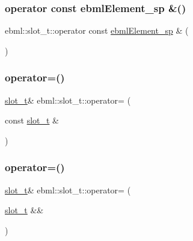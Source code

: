 \subsubsection{\texorpdfstring{operator const ebml\+Element\+\_\+sp \&()}{operator const ebmlElement\_sp \&()}}
{\footnotesize\ttfamily ebml\+::slot\+\_\+t\+::operator const \mbox{\hyperlink{namespaceebml_adad533b7705a16bb360fe56380c5e7be}{ebml\+Element\+\_\+sp}} \& (\begin{DoxyParamCaption}{ }\end{DoxyParamCaption})}

\mbox{\label{classebml_1_1slot__t_a691156a7c8cbe2ffadf29255e7e30615}} 
\subsubsection{\texorpdfstring{operator=()}{operator=()}\hspace{0.1cm}{\footnotesize\ttfamily [1/6]}}
{\footnotesize\ttfamily \mbox{\hyperlink{classebml_1_1slot__t}{slot\+\_\+t}}\& ebml\+::slot\+\_\+t\+::operator= (\begin{DoxyParamCaption}\item[{const \mbox{\hyperlink{classebml_1_1slot__t}{slot\+\_\+t}} \&}]{ }\end{DoxyParamCaption})}

\mbox{\label{classebml_1_1slot__t_a81a4b0f463d89955119880b9f15d1fd1}} 
\subsubsection{\texorpdfstring{operator=()}{operator=()}\hspace{0.1cm}{\footnotesize\ttfamily [2/6]}}
{\footnotesize\ttfamily \mbox{\hyperlink{classebml_1_1slot__t}{slot\+\_\+t}}\& ebml\+::slot\+\_\+t\+::operator= (\begin{DoxyParamCaption}\item[{\mbox{\hyperlink{classebml_1_1slot__t}{slot\+\_\+t}} \&\&}]{ }\end{DoxyParamCaption})}

\mbox{\label{classebml_1_1slot__t_a3978ca348f4b1a0c4b9f0287c394e1a4}} 
